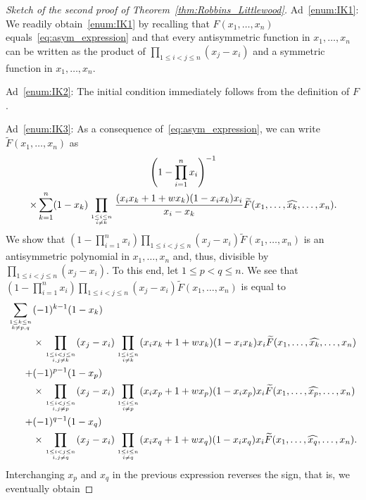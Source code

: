 \documentclass[ALCO, Unicode]{cedram}
\newcommand\myatop[2]{\genfrac{}{}{0pt}{}{#1}{#2}}
\begin{document}
\begin{proof}[Sketch of the second proof of Theorem~\ref{thm:Robbins_Littlewood}]
		Ad~\ref{enum:IK1}: We readily obtain~\ref{enum:IK1} by recalling that $F(x_1,\dots,x_n)$ equals~\eqref{eq:asym_expression} and that every antisymmetric function in $x_1,\dots,x_n$ can be written as the product of $\prod_{1\le i<j\le n}(x_{j}-x_{i})$ and a symmetric function in $x_1,\dots,x_n$.
		
		Ad~\ref{enum:IK2}: The initial condition immediately follows from the definition of $F$.
		
		Ad~\ref{enum:IK3}: As a consequence of~\eqref{eq:asym_expression}, we can write $\widetilde{F}(x_1,\dots,x_n)$ as
		\begin{multline}\label{eq:rec_Littlewood_tilde}
			\left(1-\prod_{i=1}^n x_i\right)^{-1}\\
			\times \sum\limits_{k=1}^n (1-x_k) \prod\limits_{\myatop{1 \le i \le n}{i \neq k}} \frac{(x_i x_k+1+w x_k) (1-x_i x_k) x_i}{x_i-x_k}
			\widetilde{F}(x_1,\ldots,\widehat{x_k},\ldots,x_n).
		\end{multline}
		We show that $(1-\prod_{i=1}^n x_i) \prod_{1 \le i < j \le n} (x_j-x_i) \widetilde{F}(x_1,\dots,x_n)$ is an antisymmetric polynomial in $x_1,\dots,x_n$ and, thus, divisible by $\prod_{1 \le i < j \le n} (x_j - x_i)$.
		To this end, let $1\le p < q \le n$. We see that $(1-\prod_{i=1}^n x_i) \prod_{1 \le i < j \le n} (x_j-x_i) \widetilde{F}(x_1,\dots,x_n)$ is equal to
		\begin{equation*}
			\begin{aligned}[t]
				\sum\limits_{\myatop{1 \le k \le n}{k \neq p,q}} & (-1)^{k-1} (1-x_k)\\
				& \times \prod_{\myatop{1 \le i < j \le n}{i,j \neq k}} (x_j-x_i) \prod\limits_{\myatop{1 \le i \le n}{i \neq k}} (x_i x_k+1+w x_k) (1-x_i x_k) x_i
				\widetilde{F}(x_1,\ldots,\widehat{x_k},\ldots,x_n)\\
				+ & (-1)^{p-1} (1-x_p)\\
				& \times \prod_{\myatop{1 \le i < j \le n}{i,j \neq p}} (x_j-x_i) \prod\limits_{\myatop{1 \le i \le n}{i \neq p}} (x_i x_p+1+w x_p) (1-x_i x_p) x_i
				\widetilde{F}(x_1,\ldots,\widehat{x_p},\ldots,x_n)\\
				+ & (-1)^{q-1} (1-x_q)\\
				& \times \prod_{\myatop{1 \le i < j \le n}{i,j \neq q}} (x_j-x_i) \prod\limits_{\myatop{1 \le i \le n}{i \neq q}} (x_i x_q+1+w x_q) (1-x_i x_q) x_i
				\widetilde{F}(x_1,\ldots,\widehat{x_q},\ldots,x_n).
			\end{aligned}
		\end{equation*}
		Interchanging $x_p$ and $x_q$ in the previous expression reverses the sign, that is, we eventually obtain 

\end{proof}
\end{document}
